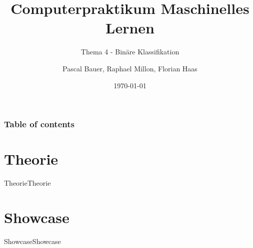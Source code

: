 \documentclass[9pt]{beamer}
\title{Computerpraktikum Maschinelles Lernen}
\subtitle{Thema 4 - Binäre Klassifikation}
\author{Pascal Bauer, Raphael Millon, Florian Haas}
\institute{Sommersemester 2020}
\date{\today}
\begin{document}
\titlepage 

\begin{frame}
 \frametitle{Table of contents}
 \tableofcontents
\end{frame}

\section{Theorie}
\begin{frame}{Theorie}{Theorie}

\end{frame}

\section{Showcase}
\begin{frame}{Showcase}{Showcase}

\end{frame}
\end{document}
